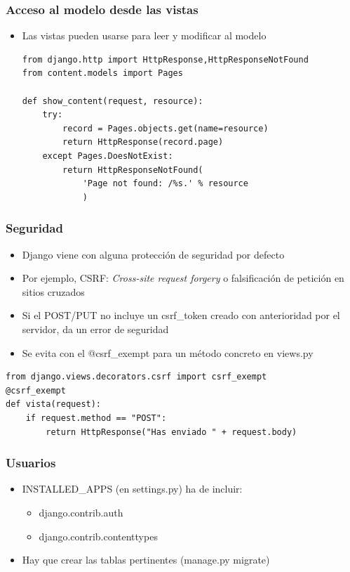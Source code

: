 \begin{frame}[fragile]
\frametitle{Acceso al modelo desde las vistas}

\begin{itemize}
\item Las vistas pueden usarse para leer y modificar al modelo
\begin{verbatim}
from django.http import HttpResponse,HttpResponseNotFound
from content.models import Pages

def show_content(request, resource):
    try:
        record = Pages.objects.get(name=resource)
        return HttpResponse(record.page)
    except Pages.DoesNotExist:
        return HttpResponseNotFound(
            'Page not found: /%s.' % resource
            )
\end{verbatim}
\end{itemize}
\end{frame}

\begin{frame}[fragile]
\frametitle{Seguridad}

\begin{itemize}
  \item Django viene con alguna protección de seguridad por defecto
  \item Por ejemplo, CSRF: \emph{Cross-site request forgery} o falsificación de petición en sitios cruzados
  \item Si el POST/PUT no incluye un csrf\_token creado con anterioridad por el servidor, da un error de seguridad
  \item Se evita con el @csrf\_exempt para un método concreto en views.py
\end{itemize}

\begin{verbatim}
from django.views.decorators.csrf import csrf_exempt
@csrf_exempt
def vista(request):
    if request.method == "POST":
        return HttpResponse("Has enviado " + request.body)
\end{verbatim}

\end{frame}


\begin{frame}
\frametitle{Usuarios}

\begin{itemize}
\item INSTALLED\_APPS (en settings.py) ha de incluir:
  \begin{itemize}
  \item django.contrib.auth
  \item django.contrib.contenttypes
  \end{itemize}
\item Hay que crear las tablas pertinentes (manage.py migrate)
\end{itemize}
\end{frame}


